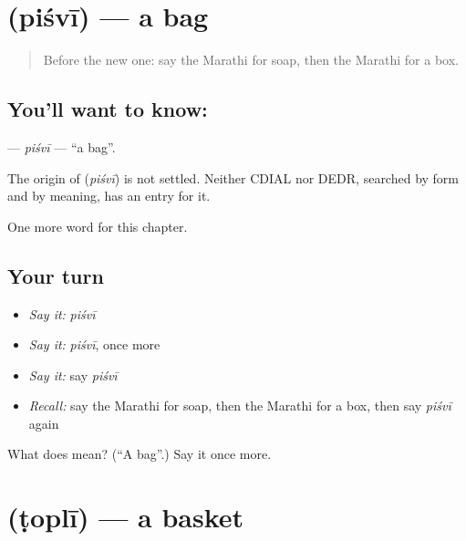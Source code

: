 \section[\texorpdfstring{\mr{पिशवी} (piśvī)}{पिशवी (piśvī)}]{ (piśvī) — a bag}

\label{lesson:MR-C133-pisvi}



\begin{quote}
Before the new one: say the Marathi for soap, then the Marathi for a box.
\end{quote}

\subsection*{You'll want to know: }
\textbf{} — \emph{piśvī} — \textquotedblleft{}a bag\textquotedblright{}.

\begin{cousinweb}
The origin of \textbf{} (\emph{piśvī}) is not settled. Neither CDIAL nor DEDR, searched by form and by meaning, has an entry for it.
\end{cousinweb}

\begin{grammarlens}[title={What you've built}]
One more word for this chapter.
\end{grammarlens}

\subsection*{Your turn}
\begin{itemize}
\raggedright
  \item \emph{Say it:} \emph{piśvī}
  \item \emph{Say it:} \emph{piśvī}, once more
  \item \emph{Say it:} say \emph{piśvī}
  \item \emph{Recall:} say the Marathi for soap, then the Marathi for a box, then say \emph{piśvī} again
\end{itemize}

\begin{tcolorbox}[breakable,colback=teal!4,colframe=teal!35!black,title={Before you move on}]
What does  mean? (\textquotedblleft{}A bag\textquotedblright{}.) Say it once more.
\end{tcolorbox}
\section[\texorpdfstring{\mr{टोपली} (ṭoplī)}{टोपली (ṭoplī)}]{ (ṭoplī) — a basket}

